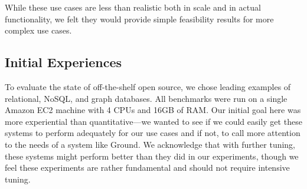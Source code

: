 \documentclass{sig-alternate}
\begin{document}
While these use cases are less than realistic both in scale and in actual functionality, we felt they would provide simple feasibility results for more complex use cases.

\subsection{Initial Experiences}
\label{sec:perf}
To evaluate the state of off-the-shelf open source, we chose leading examples of relational, NoSQL, and graph databases.
All benchmarks were run on a single Amazon EC2  machine with 4 CPUs and 16GB of RAM. 
Our initial goal here was more experiential than quantitative---we wanted to see if we could easily get these systems to perform adequately for our use cases and if not, to call more attention to the needs of a system like Ground.
We acknowledge that with further tuning, these systems might perform better than they did in our experiments, though we feel these experiments are rather fundamental and should not require intensive tuning.
\end{document}
